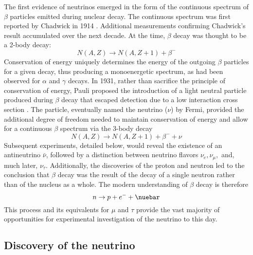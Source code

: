 The first evidence of neutrinos emerged in the form of
the continuous spectrum of $\beta$ particles
emitted during nuclear decay.
The continuous spectrum was first reported by Chadwick in 1914 \cite{chadwick_beta}.
Additional measurements confirming Chadwick's result accumulated over the next decade.
At the time, $\beta$ decay was thought to be a 2-body decay:
\begin{equation}\label{eq:old_beta}
    N(A, Z) \to N(A, Z+1) + \beta^-
\end{equation}
Conservation of energy uniquely determines the energy
of the outgoing $\beta$ particles for a given decay,
thus producing a monoenergetic spectrum,
as had been observed for $\alpha$ and $\gamma$ decays.
In 1931, rather than sacrifice the principle of conservation of energy,
Pauli proposed the introduction of a light neutral particle
produced during $\beta$ decay that escaped detection
due to a low interaction cross section \cite{pauli_letter}.
The particle, eventually named the neutrino ($\nu$) by Fermi,
provided the additional degree of freedom needed
to maintain conservation of energy and allow for a continuous $\beta$ spectrum
via the 3-body decay
\begin{equation}\label{eq:beta_mid}
    N(A, Z) \to N(A, Z+1) + \beta^- + \nu
\end{equation}
Subsequent experiments, detailed below,
would reveal the existence of an antineutrino $\bar{\nu}$,
followed by a distinction between neutrino flavors $\nu_e, \nu_\mu,$
and, much later, $\nu_\tau$.
Additionally, the discoveries of the proton and neutron
led to the conclusion that $\beta$ decay was the result of
the decay of a single neutron rather than of the nucleus as a whole.
The modern understanding of $\beta$ decay is therefore
\begin{equation}\label{eq:beta_modern}
    n \to p + e^- + \nuebar
\end{equation}
This process and its equivalents for $\mu$ and $\tau$
provide the vast majority of opportunities for
experimental investigation of the neutrino to this day.

\subsection{Discovery of the neutrino}
\label{subsec:discovery}


